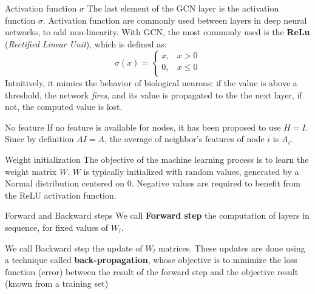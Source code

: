 \documentclass[a4paper,11pt]{book}
\begin{document}
\begin{textbox}{Activation function $\sigma$}
The last element of the GCN layer is the activation function $\sigma$. Activation function are commonly used between layers in deep neural networks, to add non-linearity. With GCN, the most commonly used is the \textbf{ReLu} (\textit{Rectified Linear Unit}), which is defined as:
 \[
    \sigma(x) = \begin{cases}
        x, & x > 0\\
        0, & x\leq 0\\
        \end{cases}
  \]
 Intuitively, it mimics the behavior of biological neurons: if the value is above a threshold, the network \textit{fires}, and its value is propagated to the the next layer, if not, the computed value is lost.

\end{textbox}

\begin{textbox}{No feature}
If no feature is available for nodes, it has been proposed to use $H=I$. Since by definition $AI=A$, the average of neighbor's features of node $i$ is $A_i$.
\end{textbox}


\begin{textbox}{Weight initialization}
The objective of the machine learning process is to learn the weight matrix $W$. $W$ is typically initialized with random values, generated by a Normal distribution centered on 0. Negative values are required to benefit from the ReLU activation function.
\end{textbox}



\begin{textbox}{Forward and Backward steps}
We call \textbf{Forward step} the computation of layers in sequence, for fixed values of $W_l$. 

We call Backward step the update of $W_l$ matrices. These updates are done using a technique called \textbf{back-propagation}, whose objective is to minimize the loss function (error) between the result of the forward step and the objective result (known from a training set)
\end{textbox}
\end{document}
